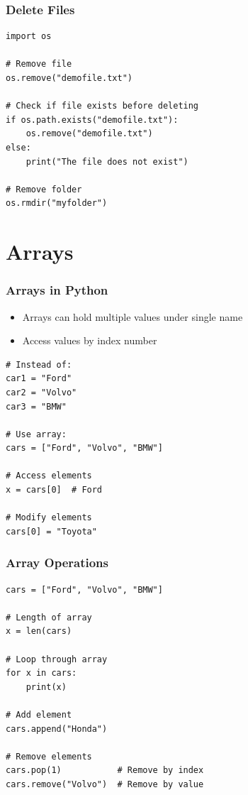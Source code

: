 \documentclass[aspectratio=169]{beamer}
\begin{document}
\begin{frame}[fragile]
\frametitle{Delete Files}
\begin{lstlisting}
import os

# Remove file
os.remove("demofile.txt")

# Check if file exists before deleting
if os.path.exists("demofile.txt"):
    os.remove("demofile.txt")
else:
    print("The file does not exist")

# Remove folder
os.rmdir("myfolder")
\end{lstlisting}
\end{frame}

\section{Arrays}

\begin{frame}[fragile]
\frametitle{Arrays in Python}
\begin{itemize}
\item Arrays can hold multiple values under single name
\item Access values by index number
\end{itemize}

\begin{lstlisting}
# Instead of:
car1 = "Ford"
car2 = "Volvo"
car3 = "BMW"

# Use array:
cars = ["Ford", "Volvo", "BMW"]

# Access elements
x = cars[0]  # Ford

# Modify elements
cars[0] = "Toyota"
\end{lstlisting}
\end{frame}

\begin{frame}[fragile]
\frametitle{Array Operations}
\begin{lstlisting}
cars = ["Ford", "Volvo", "BMW"]

# Length of array
x = len(cars)

# Loop through array
for x in cars:
    print(x)

# Add element
cars.append("Honda")

# Remove elements
cars.pop(1)           # Remove by index
cars.remove("Volvo")  # Remove by value
\end{lstlisting}
\end{frame}
\end{document}
